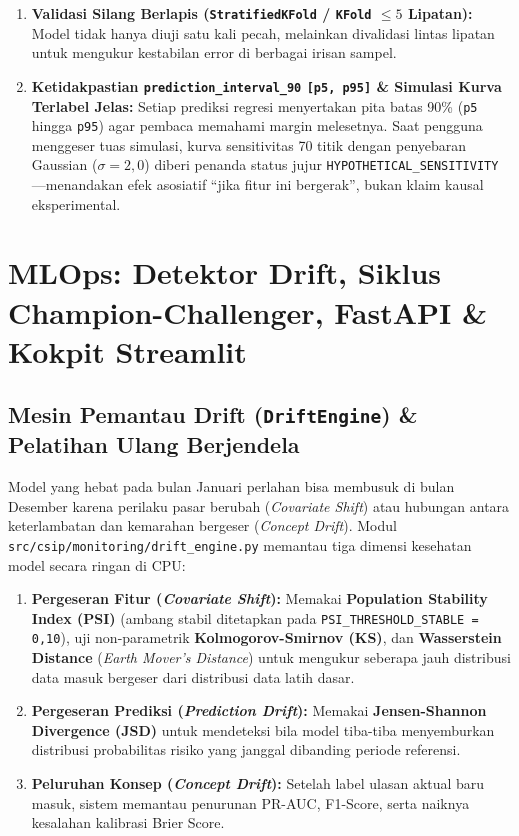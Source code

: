 \documentclass[11pt,a4paper,oneside]{book}
\newcommand{\code}[1]{{\small\nolinkurl{#1}}}
\begin{document}
\begin{teknisbox}
\begin{enumerate}
\begin{itemize}
    \end{itemize}
  \item \textbf{Validasi Silang Berlapis (\code{StratifiedKFold} / \code{KFold} $\le 5$ Lipatan):} Model tidak hanya diuji satu kali pecah, melainkan divalidasi lintas lipatan untuk mengukur kestabilan error di berbagai irisan sampel.
  \item \textbf{Ketidakpastian \code{prediction_interval_90} \code{[p5, p95]} \& Simulasi Kurva Terlabel Jelas:} Setiap prediksi regresi menyertakan pita batas 90\% (\code{p5} hingga \code{p95}) agar pembaca memahami margin melesetnya. Saat pengguna menggeser tuas simulasi, kurva sensitivitas 70 titik dengan penyebaran Gaussian ($\sigma = 2{,}0$) diberi penanda status jujur \code{HYPOTHETICAL_SENSITIVITY}---menandakan efek asosiatif ``jika fitur ini bergerak'', bukan klaim kausal eksperimental.
\end{enumerate}
\end{teknisbox}

\chapter{MLOps: Detektor Drift, Siklus Champion-Challenger, FastAPI \& Kokpit Streamlit}

\section{Mesin Pemantau Drift (\texttt{DriftEngine}) \& Pelatihan Ulang Berjendela}

Model yang hebat pada bulan Januari perlahan bisa membusuk di bulan Desember karena perilaku pasar berubah (\emph{Covariate Shift}) atau hubungan antara keterlambatan dan kemarahan bergeser (\emph{Concept Drift}). Modul \code{src/csip/monitoring/drift_engine.py} memantau tiga dimensi kesehatan model secara ringan di CPU:
\begin{enumerate}
  \item \textbf{Pergeseran Fitur (\emph{Covariate Shift}):} Memakai \textbf{Population Stability Index (PSI)} (ambang stabil ditetapkan pada \code{PSI_THRESHOLD_STABLE = 0,10}), uji non-parametrik \textbf{Kolmogorov-Smirnov (KS)}, dan \textbf{Wasserstein Distance} (\emph{Earth Mover's Distance}) untuk mengukur seberapa jauh distribusi data masuk bergeser dari distribusi data latih dasar.
  \item \textbf{Pergeseran Prediksi (\emph{Prediction Drift}):} Memakai \textbf{Jensen-Shannon Divergence (JSD)} untuk mendeteksi bila model tiba-tiba menyemburkan distribusi probabilitas risiko yang janggal dibanding periode referensi.
  \item \textbf{Peluruhan Konsep (\emph{Concept Drift}):} Setelah label ulasan aktual baru masuk, sistem memantau penurunan PR-AUC, F1-Score, serta naiknya kesalahan kalibrasi Brier Score.
\end{enumerate}
\end{document}
